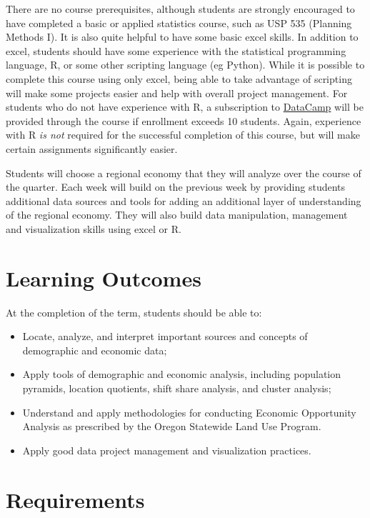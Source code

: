 \documentclass[11pt,]{article}
\begin{document}
There are no course prerequisites, although students are strongly
encouraged to have completed a basic or applied statistics course, such
as USP 535 (Planning Methods I). It is also quite helpful to have some
basic excel skills. In addition to excel, students should have some
experience with the statistical programming language, R, or some other
scripting language (eg Python). While it is possible to complete this
course using only excel, being able to take advantage of scripting will
make some projects easier and help with overall project management. For
students who do not have experience with R, a subscription to
\href{https://www.datacamp.com/}{DataCamp} will be provided through the
course if enrollment exceeds 10 students. Again, experience with R
\emph{is not} required for the successful completion of this course, but
will make certain assignments significantly easier.

Students will choose a regional economy that they will analyze over the
course of the quarter. Each week will build on the previous week by
providing students additional data sources and tools for adding an
additional layer of understanding of the regional economy. They will
also build data manipulation, management and visualization skills using
excel or R.

\section{Learning Outcomes}\label{learning-outcomes}

At the completion of the term, students should be able to:

\begin{itemize}
\item
  Locate, analyze, and interpret important sources and concepts of
  demographic and economic data;
\item
  Apply tools of demographic and economic analysis, including population
  pyramids, location quotients, shift share analysis, and cluster
  analysis;
\item
  Understand and apply methodologies for conducting Economic Opportunity
  Analysis as prescribed by the Oregon Statewide Land Use Program.
\item
  Apply good data project management and visualization practices.
\end{itemize}

\section{Requirements}\label{requirements}
\end{document}
